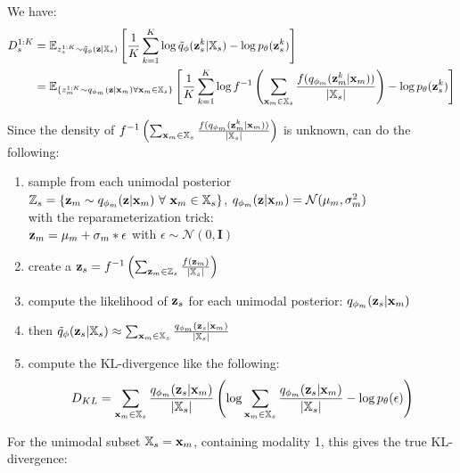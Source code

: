 \documentclass[11pt, english]{article}
\begin{document}
    We have:
    \begin{equation}
        \begin{split}
            D^{1:K}_s &=  \mathbb{E}_{z^{1:K}_s \sim \tilde{q}_{\phi}(\textbf{z}|\mathbb{X}_s)} \left[ \frac{1}{K} \sum _{k=1}^K \log \tilde{q}_{\phi}(\textbf{z}^k _s|\mathbb{X}_s) - \log p_{\theta}(\textbf{z}^k _s) \right]\\
            &= \mathbb{E}_{\{z^{1:K}_m \sim q_{\phi_m}(\textbf{z}|\textbf{x}_m) \forall \textbf{x}_m \in \mathbb{X}_s\}} \left[ \frac{1}{K} \sum _{k=1}^K \log f^{-1}\left(\sum _{\textbf{x}_m \in \mathbb{X}_s} \frac{f(q_{\phi_m}(\textbf{z}_m^k|\textbf{x}_m))}{|\mathbb{X}_s|}\right) - \log p_{\theta}(\textbf{z}^k _s) \right]
        \end{split}
    \end{equation}

    Since the density of $f^{-1}\left(\sum _{\textbf{x}_m \in \mathbb{X}_s} \frac{f(q_{\phi_m}(\textbf{z}_m^k|\textbf{x}_m))}{|\mathbb{X}_s|}\right)$ is unknown, can do the following:
    \begin{enumerate}
        \item sample from each unimodal posterior\\
        $\mathbb{Z}_s = \{\zm \sim \unimodalpost\ \forall\ \samplem \in \xsubset \}$, $q_{\phi_m}(\textbf{z}|\textbf{x}_m) = \mathcal{N}(\mu_m,\sigma^2_m)$\\
        with the reparameterization trick:\\ $\textbf{z}_m = \mu_m + \sigma_m \ast \epsilon$ with $\epsilon \sim  \mathcal{N}(0,\textbf{I})$
        \item create a $\textbf{z}_s=f^{-1}\left(\sum _{\textbf{z}_m \in \mathbb{Z}_s} \frac{f(\textbf{z}_m)}{|\mathbb{X}_s|}\right)$
        \item compute the likelihood of $\textbf{z}_s$ for each unimodal posterior: $q_{\phi_m}(\textbf{z}_s|\textbf{x}_m)$
        \item then $\tilde{q}_{\phi}(\textbf{z}_s|\mathbb{X}_s) \approx \sum _{\textbf{x}_m \in \mathbb{X}_s} \frac{q_{\phi_m}(\textbf{z}_s|\textbf{x}_m)}{|\mathbb{X}_s|}$
        \item compute the KL-divergence like the following:
        $$D_{KL}=\sum _{\textbf{x}_m \in \mathbb{X}_s} \frac{q_{\phi_m}(\textbf{z}_s|\textbf{x}_m)}{|\mathbb{X}_s|}\left(\log \sum _{\textbf{x}_m \in \mathbb{X}_s} \frac{q_{\phi_m}(\textbf{z}_s|\textbf{x}_m)}{|\mathbb{X}_s|} - \log p_{\theta}(\epsilon) \right)$$
    \end{enumerate}


    For the unimodal subset $\mathbb{X}_s = \textbf{x}_m$, containing modality 1, this gives the true KL-divergence:
\end{document}
